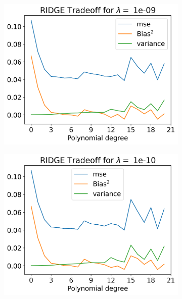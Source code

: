 \documentclass[12pt]{article}
\begin{document}
\begin{figure}[H]
\begin{subfigure}{.5\textwidth}
    \caption{}
    \label{fig:l_1e-08}
  \end{subfigure}
  \begin{subfigure}{.5\textwidth}
    \centering
    \includegraphics[width=\textwidth]{../figures/tradeoff_RIDGE_1e-09_20.png}
    \caption{}
    \label{fig:l_1e-09}
  \end{subfigure}
  \begin{subfigure}{.5\textwidth}
    \centering
    \includegraphics[width=\textwidth]{../figures/tradeoff_RIDGE_1e-10_20.png}
    \caption{}
    \label{fig:l_1e-10}
  \end{subfigure}

\end{figure}
\end{document}
